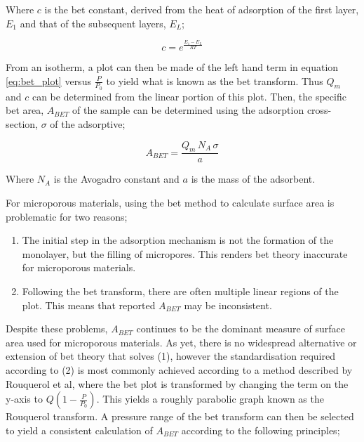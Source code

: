 Where $c$ is the \acrshort{bet} constant, derived from the heat of \gls{adsorption} of the first layer, $E_1$ and that of the subsequent layers, $E_L$;

\begin{equation}
    c = e^{\frac{E_1 - E_L}{RT}}
\end{equation}

From an isotherm, a plot can then be made of the left hand term in equation \ref{eq:bet_plot} versus $\frac{P}{P_0}$ to yield what is known as the \acrshort{bet} transform. Thus $Q_m$ and $c$ can be determined from the linear portion of this plot. Then, the specific \acrshort{bet} area, $A_{BET}$ of the sample can be determined using the \gls{adsorption} cross-section, $\sigma$ of the adsorptive;

\begin{equation}
    A_{BET} = \frac{Q_m \, N_A \, \sigma}{a}
\end{equation}


Where $N_A$ is the Avogadro constant and $a$ is the mass of the \gls{adsorbent}.\citep{Brunauer1938Adsorption}

For microporous materials, using the \acrshort{bet} method to calculate surface area is problematic for two reasons;

	\begin{enumerate}[label=(\arabic*)]
		\item The initial step in the \gls{adsorption} mechanism is not the formation of the monolayer, but the filling of \glspl{micropore}. This renders \acrshort{bet} theory inaccurate for microporous materials.
		\item 	Following the \acrshort{bet} transform, there are often multiple linear regions of the plot. This means that reported $A_{BET}$ may be inconsistent.
	\end{enumerate}

Despite these problems, $A_{BET}$ continues to be the dominant measure of surface area used for microporous materials. As yet, there is no widespread alternative or extension of \acrshort{bet} theory that solves (1), however the standardisation required according to (2) is most commonly achieved according to a method described by Rouquerol et al, where the \acrshort{bet} plot is transformed by changing the term on the y-axis to $Q \left(1 - \frac{P}{P_0} \right)$. This yields a roughly parabolic graph known as the Rouquerol transform. A pressure range of the \acrshort{bet} transform can then be selected to yield a consistent calculation of $A_{BET}$ according to the following principles;

